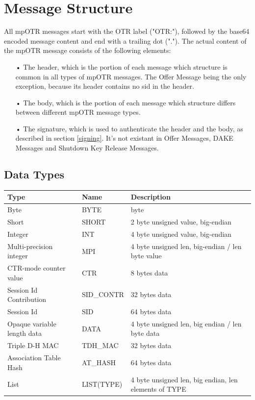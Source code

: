 \documentclass[12pt,titlepage,a4paper]{article}
\begin{document}
\section{Message Structure}

All mpOTR messages start with the OTR label ("OTR:"), followed by the base64 encoded message content and end with a trailing dot ("."). The actual content of the mpOTR message consists of the following elements: \\

\begin{itemize}
	\item[•]The header, which is the portion of each message which structure is common in all types of mpOTR messages. The Offer Message being the only exception, because its header contains no sid in the header.

	\item[•]The body, which is the portion of each message which structure differs between different mpOTR message types.

	\item[•]The signature, which is used to authenticate the header and the body, as described in section \ref{signing}. It's not existant in Offer Messages, DAKE Messages and Shutdown Key Release Messages.
\end{itemize}


\subsection{Data Types}
\begin{tabular}{l l l}
Type & Name & Description \\
\hline
Byte & BYTE & byte \\
Short & SHORT & 2 byte unsigned value, big-endian \\
Integer & INT & 4 byte unsigned value, big-endian \\
Multi-precision integer & MPI & 4 byte unsigned len, big-endian / len byte value \\
CTR-mode counter value & CTR & 8 bytes data \\
Session Id Contribution & SID\_CONTR & 32 bytes data \\
Session Id & SID & 64 bytes data \\
Opaque variable length data & DATA & 4 byte unsigned len, big endian / len byte data \\
Triple D-H MAC & TDH\_MAC & 32 bytes data \\
Association Table Hash & AT\_HASH & 64 bytes data \\
List & LIST(TYPE) & 4 byte unsigned len, big endian, len elements of TYPE \\
\end{tabular}
\end{document}
